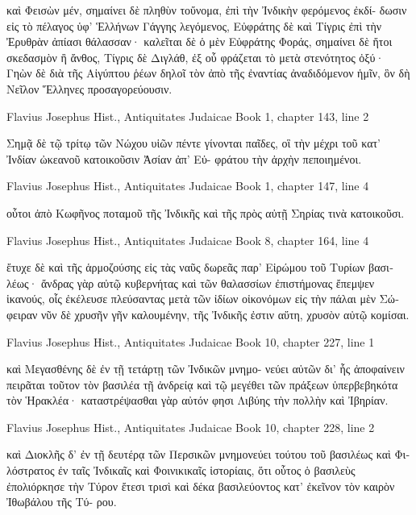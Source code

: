 \documentclass[12pt,letterpaper,twoside,final]{memoir}
\begin{document}
\begin{greek}
                                                             καὶ Φεισὼν 
μέν, σημαίνει δὲ πληθὺν τοὔνομα, ἐπὶ τὴν Ἰνδικὴν φερόμενος ἐκδί-
δωσιν εἰς τὸ πέλαγος ὑφ' Ἑλλήνων Γάγγης λεγόμενος, Εὐφράτης 
δὲ καὶ Τίγρις ἐπὶ τὴν Ἐρυθρὰν ἀπίασι θάλασσαν· καλεῖται δὲ ὁ 
μὲν Εὐφράτης Φοράς, σημαίνει δὲ ἤτοι σκεδασμὸν ἢ ἄνθος, Τίγρις 
δὲ Διγλάθ, ἐξ οὗ φράζεται τὸ μετὰ στενότητος ὀξύ· Γηὼν δὲ διὰ 
τῆς Αἰγύπτου ῥέων δηλοῖ τὸν ἀπὸ τῆς ἐναντίας ἀναδιδόμενον ἡμῖν, 
ὃν δὴ Νεῖλον Ἕλληνες προσαγορεύουσιν. 



Flavius Josephus Hist., Antiquitates Judaicae 
Book 1, chapter 143, line 2

Σημᾷ δὲ τῷ τρίτῳ τῶν Νώχου υἱῶν πέντε γίνονται παῖδες, 
οἳ τὴν μέχρι τοῦ κατ' Ἰνδίαν ὠκεανοῦ κατοικοῦσιν Ἀσίαν ἀπ' Εὐ-
φράτου τὴν ἀρχὴν πεποιημένοι. 



Flavius Josephus Hist., Antiquitates Judaicae 
Book 1, chapter 147, line 4

                                                     οὗτοι ἀπὸ Κωφῆνος 
ποταμοῦ τῆς Ἰνδικῆς καὶ τῆς πρὸς αὐτῇ Σηρίας τινὰ κατοικοῦσι. 



Flavius Josephus Hist., Antiquitates Judaicae 
Book 8, chapter 164, line 4

                                          ἔτυχε δὲ καὶ τῆς ἁρμοζούσης εἰς 
τὰς ναῦς δωρεᾶς παρ' Εἰρώμου τοῦ Τυρίων βασιλέως· ἄνδρας γὰρ 
αὐτῷ κυβερνήτας καὶ τῶν θαλασσίων ἐπιστήμονας ἔπεμψεν ἱκανούς, 
οἷς ἐκέλευσε πλεύσαντας μετὰ τῶν ἰδίων οἰκονόμων εἰς τὴν πάλαι 
μὲν Σώφειραν νῦν δὲ χρυσῆν γῆν καλουμένην, τῆς Ἰνδικῆς ἐστιν 
αὕτη, χρυσὸν αὐτῷ κομίσαι. 



Flavius Josephus Hist., Antiquitates Judaicae 
Book 10, chapter 227, line 1

           καὶ Μεγασθένης δὲ ἐν τῇ τετάρτῃ τῶν Ἰνδικῶν μνημο-
νεύει αὐτῶν δι' ἧς ἀποφαίνειν πειρᾶται τοῦτον τὸν βασιλέα τῇ 
ἀνδρείᾳ καὶ τῷ μεγέθει τῶν πράξεων ὑπερβεβηκότα τὸν Ἡρακλέα· 
καταστρέψασθαι γὰρ αὐτόν φησι Λιβύης τὴν πολλὴν καὶ Ἰβηρίαν. 



Flavius Josephus Hist., Antiquitates Judaicae 
Book 10, chapter 228, line 2

καὶ Διοκλῆς δ' ἐν τῇ δευτέρᾳ τῶν Περσικῶν μνημονεύει τούτου 
τοῦ βασιλέως καὶ Φιλόστρατος ἐν ταῖς Ἰνδικαῖς καὶ Φοινικικαῖς 
ἱστορίαις, ὅτι οὗτος ὁ βασιλεὺς ἐπολιόρκησε τὴν Τύρον ἔτεσι τρισὶ 
καὶ δέκα βασιλεύοντος κατ' ἐκεῖνον τὸν καιρὸν Ἰθωβάλου τῆς Τύ-
ρου. 




\end{greek}
\end{document}
